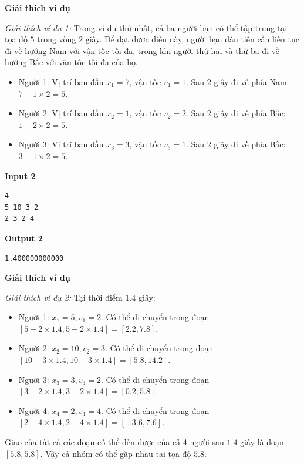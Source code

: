 \documentclass[12pt,a4paper]{article}
\newcommand{\explanation}{%
  \vspace{6pt}\textbf{\textcolor{sectioncolor}{Giải thích ví dụ}}\par\vspace{2pt}%
}
\begin{document}
\explanation
\textit{Giải thích ví dụ 1:} 
Trong ví dụ thứ nhất, cả ba người bạn có thể tập trung tại tọa độ $5$ trong vòng $2$ giây. Để đạt được điều này, người bạn đầu tiên cần liên tục đi về hướng Nam với vận tốc tối đa, trong khi người thứ hai và thứ ba đi về hướng Bắc với vận tốc tối đa của họ. 
\begin{itemize}
    \item Người 1: Vị trí ban đầu $x_1 = 7$, vận tốc $v_1 = 1$. Sau $2$ giây đi về phía Nam: $7 - 1 \times 2 = 5$.
    \item Người 2: Vị trí ban đầu $x_2 = 1$, vận tốc $v_2 = 2$. Sau $2$ giây đi về phía Bắc: $1 + 2 \times 2 = 5$.
    \item Người 3: Vị trí ban đầu $x_3 = 3$, vận tốc $v_3 = 1$. Sau $2$ giây đi về phía Bắc: $3 + 1 \times 2 = 5$.
\end{itemize}

\textbf{Input 2}
\begin{lstlisting}
4
5 10 3 2
2 3 2 4
\end{lstlisting}

\textbf{Output 2}
\begin{lstlisting}
1.400000000000
\end{lstlisting}

\explanation
\textit{Giải thích ví dụ 2:}
Tại thời điểm $1.4$ giây:
\begin{itemize}
    \item Người 1: $x_1 = 5, v_1 = 2$. Có thể di chuyển trong đoạn $[5 - 2 \times 1.4, 5 + 2 \times 1.4] = [2.2, 7.8]$.
    \item Người 2: $x_2 = 10, v_2 = 3$. Có thể di chuyển trong đoạn $[10 - 3 \times 1.4, 10 + 3 \times 1.4] = [5.8, 14.2]$.
    \item Người 3: $x_3 = 3, v_3 = 2$. Có thể di chuyển trong đoạn $[3 - 2 \times 1.4, 3 + 2 \times 1.4] = [0.2, 5.8]$.
    \item Người 4: $x_4 = 2, v_4 = 4$. Có thể di chuyển trong đoạn $[2 - 4 \times 1.4, 2 + 4 \times 1.4] = [-3.6, 7.6]$.
\end{itemize}
Giao của tất cả các đoạn có thể đến được của cả 4 người sau $1.4$ giây là đoạn $[5.8, 5.8]$. Vậy cả nhóm có thể gặp nhau tại tọa độ $5.8$.


\newpage




\end{document}
